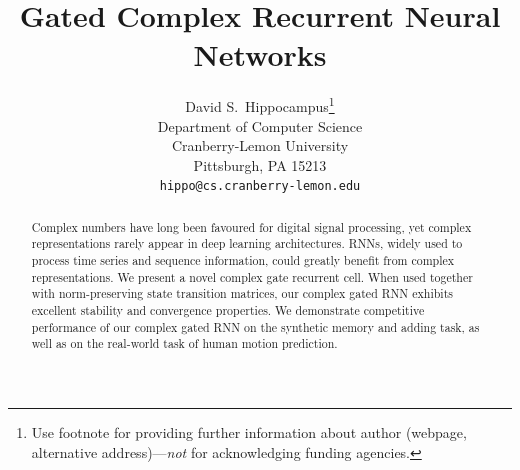 \documentclass{article}
\title{Gated Complex Recurrent Neural Networks}
\author{
  David S.~Hippocampus\thanks{Use footnote for providing further
    information about author (webpage, alternative
    address)---\emph{not} for acknowledging funding agencies.} \\
  Department of Computer Science\\
  Cranberry-Lemon University\\
  Pittsburgh, PA 15213 \\
  \texttt{hippo@cs.cranberry-lemon.edu} \\
}
\begin{document}

\maketitle

\begin{abstract}
Complex numbers have long been favoured for digital signal processing, yet complex representations rarely appear in deep learning architectures.  RNNs, widely used to process time series and sequence information, could greatly benefit from complex representations.  We present a novel complex gate recurrent cell.  When used together with norm-preserving state transition matrices, our complex gated RNN exhibits excellent stability and convergence properties.  We demonstrate competitive performance of our complex gated RNN on the synthetic memory and adding task, as well as on the real-world task of human motion prediction.
\end{abstract}

\end{document}
